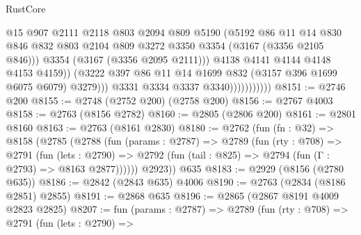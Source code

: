 \begin{lexlean}{RustCore}
\begin{coremodule}
                                    @15
                                    @907
                                    @2111
                                    @2118
                                    @803
                                    @2094
                                    @809
                                    @5190
                                    (@5192
                                      @86
                                      @11
                                      @14
                                      @830
                                      @846
                                      @832
                                      @803
                                      @2104
                                      @809
                                      @3272
                                      @3350
                                      @3354
                                      (@3167 (@3356 @2105 @846)))
                                    @3354
                                    (@3167 (@3356 @2095 @2111)))
                                  @4138
                                  @4141
                                  @4144
                                  @4148
                                  @4153
                                  @4159))
                              (@3222
                                @397
                                @86
                                @11
                                @14
                                @1699
                                @832
                                (@3157 @396 @1699 @6075 @6079)
                                @3279)))
                          @3331
                          @3334
                          @3337
                          @3340)))))))))))
@8151 := @2746 @200
@8155 := @2748 (@2752 @200) (@2758 @200)
@8156 := @2767 @4003
@8158 := @2763 (@8156 @2782)
@8160 := @2805 (@2806 @200)
@8161 := @2801 @8160
@8163 := @2763 (@8161 @2830)
@8180 := @2762
    (fun (fn : @32) =>
    @8158
      (@2785
        (@2788
          (fun (params : @2787) =>
          @2789
            (fun (rty : @708) =>
            @2791
              (fun (lets : @2790) =>
              @2792 (fun (tail : @825) => @2794 (fun (Γ : @2793) => @8163 @2877))))))
        @2923))
    @635
@8183 := @2929 (@8156 (@2780 @635))
@8186 := @2842 (@2843 @635) @4006
@8190 := @2763 (@2834 (@8186 @2851) @2855)
@8191 := @2868 @635
@8196 := @2865 (@2867 @8191 @4009 @2823 @2825)
@8207 := fun (params : @2787) =>
  @2789
    (fun (rty : @708) =>
    @2791
      (fun (lets : @2790) =>

\end{coremodule}
\end{lexlean}
